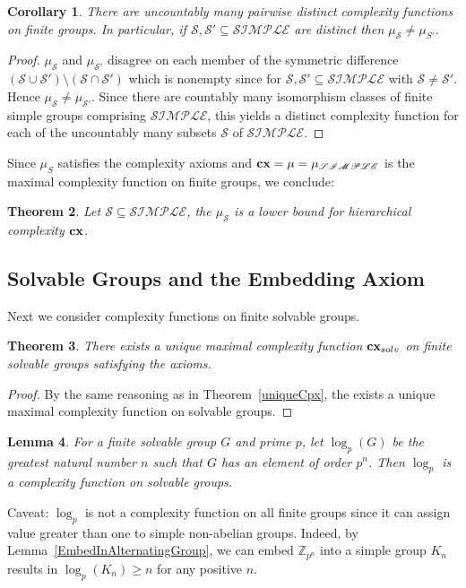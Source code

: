 \documentclass[a4paper,11pt]{amsart}
\newtheorem{theorem}{Theorem}[section]
\newtheorem{lemma}[theorem]{Lemma}
\newtheorem{corollary}[theorem]{Corollary}
\theoremstyle{definition}
\newcommand{\cx}{\mbox{\bf cx}}
\newcommand{\cxsolv}{\cx_{solv}}
\newcommand{\Z}{\mathbb{Z}}
\newcommand{\1}{{\mathbf 1}}
\renewcommand{\S}{{\mathscr{S}}}
\newcommand{\SIMPLE}{{\mathscr{SIMPLE}}}
\begin{document}
\begin{corollary}
 There are uncountably many pairwise distinct complexity functions
on finite groups. In particular, if $\S,\S' \subseteq \SIMPLE$ are distinct then $\mu_\S\neq \mu_{S'}$.
\end{corollary}
\begin{proof}
$\mu_{\S}$ and $\mu_{\S'}$ disagree on each member of the symmetric difference $(\S\cup \S') \setminus (\S\cap \S')$ which is nonempty
since for $\S,\S' \subseteq \SIMPLE$ with $\S\neq \S'$.  Hence $\mu_\S \neq \mu_{\S'}$. Since there are countably many isomorphism classes of finite simple groups comprising $\SIMPLE$, this yields a distinct complexity function for each of the uncountably many subsets $\S$
of $\SIMPLE$.  \end{proof}

Since $\mu_S$ satisfies the complexity axioms and $\cx= \mu=\mu_\SIMPLE$ is the maximal complexity function on finite groups, we conclude:
\begin{theorem}
Let $\S \subseteq \SIMPLE$, the $\mu_\S$ is a lower bound for hierarchical complexity $\cx$. 
\end{theorem}


 

\subsection{Solvable Groups and the Embedding Axiom}\label{solv}

Next we consider complexity functions on finite solvable groups.
\begin{theorem}
There exists a unique maximal complexity function  $\cxsolv$ on finite solvable groups satisfying the axioms.
\end{theorem}
\begin{proof} By the same reasoning as in  Theorem~\ref{uniqueCpx}, the exists a unique maximal complexity function on solvable groups. \end{proof}


\begin{lemma}  For a finite solvable group $G$ and prime $p$, let $\log_p(G)$ be the greatest natural number $n$ such that $G$ has an element of order $p^n$.   Then $\log_p$ is a complexity function on solvable groups.
\end{lemma}
Caveat: $\log_p$ is not a complexity function on all finite groups since it can assign value greater than one to simple non-abelian groups. Indeed, by Lemma~\ref{EmbedInAlternatingGroup}, we can embed $\Z_{p^n}$ into a simple group $K_n$ results in $\log_p(K_n) \geq n$ for any positive $n$.
\end{document}
